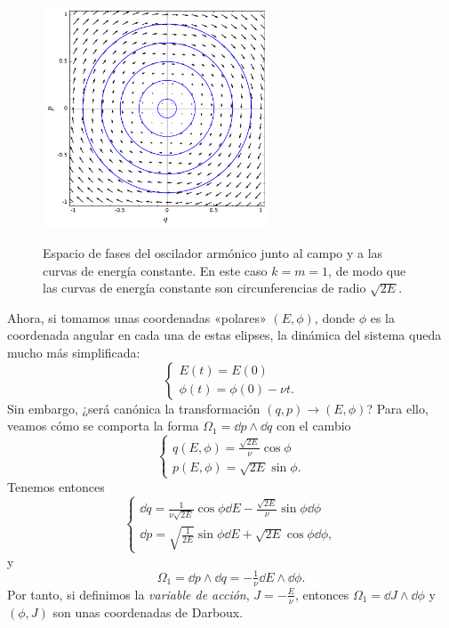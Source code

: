   \begin{figure}[h]
    \centering
    \includegraphics[width=0.6\textwidth]{pics/oscilador}
    \label{fig:oscilador}
    \caption{\small Espacio de fases del oscilador armónico junto al campo y a las curvas de energía constante. En este caso $k=m=1$, de modo que las curvas de energía constante son circunferencias de radio $\sqrt{2E}$.}
  \end{figure}

  Ahora, si tomamos unas coordenadas «polares» $(E,\phi)$, donde $\phi$ es la coordenada angular en cada una de estas elipses, la dinámica del sistema queda mucho más simplificada: 
  \begin{equation*}
    \begin{cases}
    E(t)=E(0) \\
    \phi(t)=\phi(0)-\nu t.
  \end{cases}
  \end{equation*}
  Sin embargo, ¿será canónica la transformación $(q,p) \rightarrow (E,\phi)$? Para ello, veamos cómo se comporta la forma $\Omega_1=\dd p\wedge \dd q$ con el cambio
  \begin{equation*}
    \begin{cases}
      q(E,\phi)=\frac{\sqrt{2E}}{\nu}\cos\phi\\
      p(E,\phi)=\sqrt{2E}\sin \phi.
    \end{cases}
  \end{equation*}
  Tenemos entonces
  \begin{equation*}
    \begin{cases}
      \dd q= \frac{1}{\nu \sqrt{2E}}\cos \phi \dd E - \frac{\sqrt{2E}}{\nu} \sin \phi \dd \phi \\
      \dd p= \sqrt{\frac{1}{2E}}\sin \phi \dd E + \sqrt{2E} \cos \phi \dd \phi,
    \end{cases}
  \end{equation*}
  y 
  \begin{equation*}
    \Omega_1= \dd p \wedge \dd q = -\tfrac{1}{\nu} \dd E \wedge \dd \phi.
  \end{equation*}
  Por tanto, si definimos la \emph{variable de acción}, $J=-\frac{E}{\nu}$, entonces $\Omega_1=\dd J \wedge \dd \phi$ y $(\phi,J)$ son unas coordenadas de Darboux.

